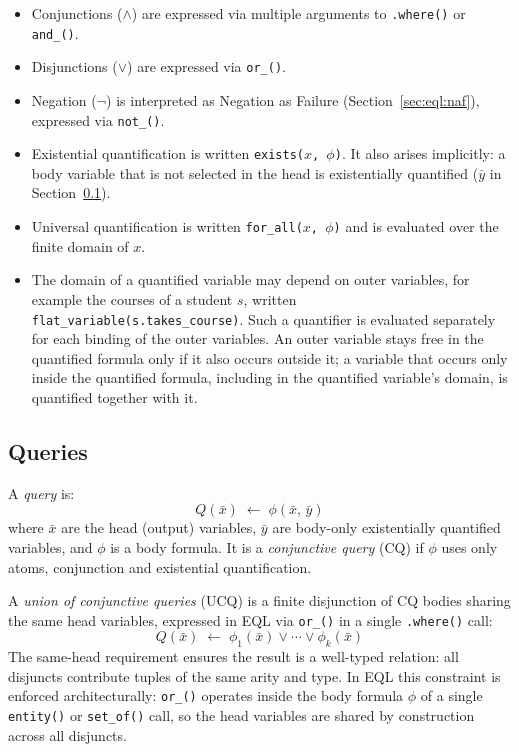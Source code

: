 \documentclass[11pt, a4paper]{article}
\theoremstyle{plain}
\theoremstyle{definition}
\theoremstyle{remark}
\begin{document}
\begin{itemize}
  \item Conjunctions ($\wedge$) are expressed via multiple arguments to \texttt{.where()} or
        \texttt{and\_()}.
  \item Disjunctions ($\vee$) are expressed via \texttt{or\_()}.
  \item Negation ($\neg$) is interpreted as Negation as Failure
        (Section~\ref{sec:eql:naf}), expressed via \texttt{not\_()}.
  \item Existential quantification is written \texttt{exists($x$, $\phi$)}.  It also arises
        implicitly: a body variable that is not selected in the head is existentially
        quantified ($\bar{y}$ in Section~\ref{sec:eql:queries}).
  \item Universal quantification is written \texttt{for\_all($x$, $\phi$)} and is evaluated over
        the finite domain of $x$.
  \item The domain of a quantified variable may depend on outer variables, for example the courses
        of a student $s$, written \texttt{flat\_variable(s.takes\_course)}.  Such a quantifier is
        evaluated separately for each binding of the outer variables.  An outer variable stays
        free in the quantified formula only if it also occurs outside it; a variable that occurs
        only inside the quantified formula, including in the quantified variable's domain, is
        quantified together with it.
\end{itemize}

\subsection{Queries}
\label{sec:eql:queries}

A \emph{query} is:
\[
  Q(\bar{x}) \;\leftarrow\; \phi(\bar{x},\,\bar{y})
\]
where $\bar{x}$ are the head (output) variables, $\bar{y}$ are body-only existentially
quantified variables, and $\phi$ is a body formula.  It is a \emph{conjunctive query} (CQ) if
$\phi$ uses only atoms, conjunction and existential quantification.

A \emph{union of conjunctive queries} (UCQ) is a finite disjunction of CQ bodies sharing the same
head variables, expressed in EQL via \texttt{or\_()} in a single \texttt{.where()} call:
\[
  Q(\bar{x}) \;\leftarrow\;
    \phi_1(\bar{x}) \vee \cdots \vee \phi_k(\bar{x})
\]
The same-head requirement ensures the result is a well-typed relation: all disjuncts
contribute tuples of the same arity and type.  In EQL this constraint is enforced
architecturally: \texttt{or\_()} operates inside the body formula $\phi$ of a single
\texttt{entity()} or \texttt{set\_of()} call, so the head variables are shared by
construction across all disjuncts.
\end{document}
